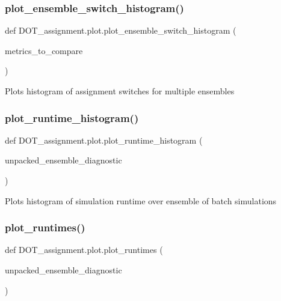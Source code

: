 \subsubsection{\texorpdfstring{plot\_ensemble\_switch\_histogram()}{plot\_ensemble\_switch\_histogram()}}
{\footnotesize\ttfamily def D\+O\+T\+\_\+assignment.\+plot.\+plot\+\_\+ensemble\+\_\+switch\+\_\+histogram (\begin{DoxyParamCaption}\item[{}]{metrics\+\_\+to\+\_\+compare }\end{DoxyParamCaption})}

\begin{DoxyVerb}Plots histogram of assignment switches for multiple ensembles
\end{DoxyVerb}
 \mbox{\label{namespace_d_o_t__assignment_1_1plot_afbb74722a284cbde02592718454e2527}} 
\subsubsection{\texorpdfstring{plot\_runtime\_histogram()}{plot\_runtime\_histogram()}}
{\footnotesize\ttfamily def D\+O\+T\+\_\+assignment.\+plot.\+plot\+\_\+runtime\+\_\+histogram (\begin{DoxyParamCaption}\item[{}]{unpacked\+\_\+ensemble\+\_\+diagnostic }\end{DoxyParamCaption})}

\begin{DoxyVerb}Plots histogram of simulation runtime over ensemble of batch simulations
\end{DoxyVerb}
 \mbox{\label{namespace_d_o_t__assignment_1_1plot_a50114c367603224c13ffcbe4a3b9af57}} 
\subsubsection{\texorpdfstring{plot\_runtimes()}{plot\_runtimes()}}
{\footnotesize\ttfamily def D\+O\+T\+\_\+assignment.\+plot.\+plot\+\_\+runtimes (\begin{DoxyParamCaption}\item[{}]{unpacked\+\_\+ensemble\+\_\+diagnostic }\end{DoxyParamCaption})}

